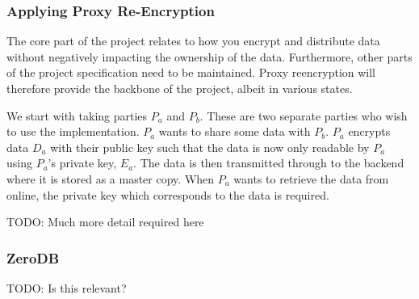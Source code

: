 
\subsubsection{Applying Proxy Re-Encryption}

The core part of the project relates to how you encrypt and distribute data without negatively impacting the ownership of the data. Furthermore, other parts of the project specification need to be maintained. Proxy reencryption will therefore provide the backbone of the project, albeit in various states.

We start with taking parties $P_a$ and $P_b$. These are two separate parties who wish to use the implementation. $P_a$ wants to share some data with $P_b$. $P_a$ encrypts data $D_a$ with their public key such that the data is now only readable by $P_a$ using $P_a$'s private key, $E_a$. The data is then transmitted through to the backend where it is stored as a master copy. When $P_a$ wants to retrieve the data from online, the private key which corresponds to the data is required.

TODO: Much more detail required here

\subsubsection{ZeroDB}

TODO: Is this relevant?
